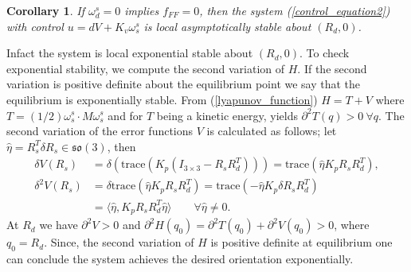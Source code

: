 \documentclass{ifacconf}
\newtheorem{corollary}[thm]{Corollary}
\begin{document}
\begin{corollary}
 If $\omega_{d}^{s} = 0$ implies $f_{FF} =0$, then the system (\ref{control_equation2}) with control $u = dV + K_{v}\omega_{s}^{s}$ is local asymptotically stable about $(R_{d},0)$.
\end{corollary}
Infact the system is local exponential stable about
$(R_{d},0)$. To check exponential stability, we compute the second variation of $H$. If the second variation is positive definite about the equilibrium point we say that the equilibrium is exponentially stable. From (\ref{lyapunov_function}) $H = T + V$ where $T= (1/2)\omega_{s}^{s}\cdot M \omega_{s}^{s}$ and for $T$ being a kinetic energy, yields $\partial^{2}T(q) > 0~ \forall q$. The second variation of the error functions $V$ is calculated as follows; let $\widehat{\eta} = R_{s}^{T}\delta R_{s} \in \mathfrak{so}(3)$, then
\begin{align}
\delta V(R_{s}) & = \delta (\mbox{trace}( K_{p}( I_{3\times 3} -  R_{s}R_{d}^{T})))=\mbox{trace}(\widehat{\eta} K_{p}  R_{s}R_{d}^{T}), \nonumber \\
\delta^{2} V(R_{s}) &= \delta \mbox{trace}(\widehat{\eta}  K_{p} R_{s}R_{d}^{T})= \mbox{trace}(- \widehat{\eta} K_{p}   \delta R_{s}R_{d}^{T}) \nonumber \\
&  = \langle \widehat{\eta},  K_{p}R_{s}R_{d}^{T} \widehat{\eta} \rangle \quad \quad \forall \widehat{\eta}\neq 0. \label{control_equation5}
\end{align}
At $R_{d}$ we have $\partial^{2}V>0$ and $\partial^{2}H(q_{0})= \partial^{2}T(q_{0}) + \partial^{2}V(q_{0})  > 0$, where $q_{0} = R_{d}$. Since, the second variation of $H$ is positive definite at equilibrium one can conclude the system achieves the desired orientation exponentially.
\end{document}
